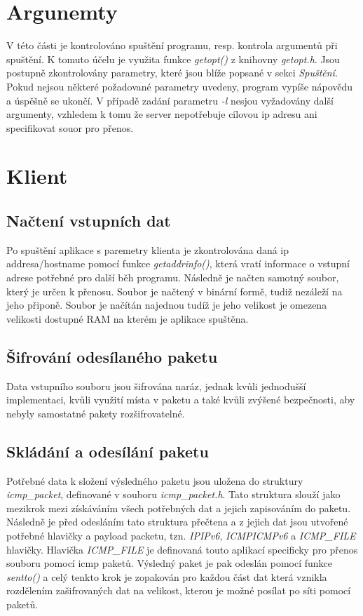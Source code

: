 \documentclass[a4paper, 11pt]{article}
\begin{document}
\section{Argunemty}
V této části je kontrolováno spuštění programu, resp. kontrola argumentů při spuštění. K tomuto účelu je využita funkce \textit{getopt()} z knihovny \textit{getopt.h}. Jsou postupně zkontrolovány parametry, které jsou blíže popsané v sekci \textit{Spuštění}. Pokud nejsou některé požadované parametry uvedeny, program vypíše nápovědu a úspěšně se ukončí. V případě zadání parametru \textit{-l} nesjou vyžadovány další argumenty, vzhledem k tomu že server nepotřebuje cílovou ip adresu ani specifikovat souor pro přenos.

\newpage
\section{Klient}

\subsection{Načtení vstupních dat}
Po spuštění aplikace s paremetry klienta je zkontrolována daná ip addresa/hostname pomocí funkce \textit{getaddrinfo()}, která vratí informace o vstupní adrese potřebné pro další běh programu. Následně je načten samotný soubor, který je určen k přenosu. Soubor je načtený v binární formě, tudiž nezáleží na jeho připoně. Soubor je načítán najednou tudíž je jeho velikost je omezena velikosti dostupné RAM na kterém je aplikace spuštěna.

\subsection{Šifrování odesílaného paketu}
Data vstupního souboru jsou šifrována naráz, jednak kvůli jednodušší implementaci, kvůli využití místa v paketu a také kvůli zvýšené bezpečnosti, aby nebyly samostatné pakety rozšifrovatelné.

\subsection{Skládání a odesílání paketu}
Potřebné data k složení výsledného paketu jsou uložena do struktury \textit{icmp\_packet}, definované v souboru \textit{icmp\_packet.h}. Tato struktura slouží jako mezikrok mezi získáváním všech potřebných dat a jejich zapisováním do paketu. Následně je před odesláním tato struktura přečtena a z jejich dat jsou utvořené potřebné hlavičky a payload packetu, tzn. \textit{IP\/IPv6}, \textit{ICMP\/ICMPv6} a \textit{ICMP\_FILE} hlavičky. Hlavička \textit{ICMP\_FILE} je definovaná touto aplikací specificky pro přenos souboru pomocí icmp paketů. Výsledný paket je pak odeslán pomocí funkce \textit{sentto()} a celý tenkto krok je zopakován pro každou část dat  která vznikla rozdělením zašifrovaných dat na velikost, kterou je možné posílat po síti pomocí paketů.
\end{document}

